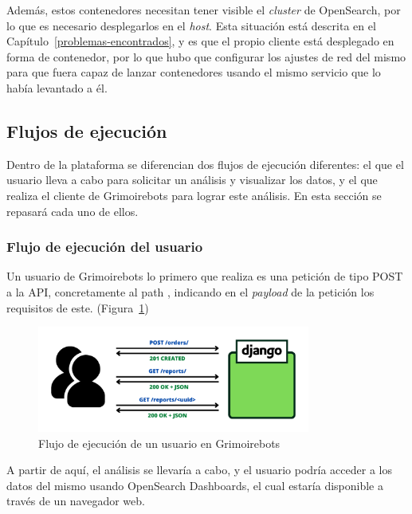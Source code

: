 Además, estos contenedores necesitan tener visible el \emph{cluster} de OpenSearch, por lo que es necesario desplegarlos en el \emph{host}. Esta situación está descrita en el Capítulo~{\ref{problemas-encontrados}}, y es que el propio cliente está desplegado en forma de contenedor, por lo que hubo que configurar los ajustes de red del mismo para que fuera capaz de lanzar contenedores usando el mismo servicio que lo había levantado a él.

\subsection{Flujos de ejecución}

Dentro de la plataforma se diferencian dos flujos de ejecución diferentes: el que el usuario lleva a cabo para solicitar un análisis y visualizar los datos, y el que realiza el cliente de Grimoirebots para lograr este análisis. En esta sección se repasará cada uno de ellos.

\subsubsection{Flujo de ejecución del usuario}

Un usuario de Grimoirebots lo primero que realiza es una petición de tipo POST a la API, concretamente al path , indicando en el \emph{payload} de la petición los requisitos de este. (Figura~{\ref{fig:grimoirebots_user_workflow}})

\begin{figure}[ht]
    \centering
    \includegraphics[width=0.8\textwidth]{Figures/grimoirebots_frontend}
    \decoRule
    \caption[Grimoirebots (flujo del usuario)]{Flujo de ejecución de un usuario en Grimoirebots}
    \label{fig:grimoirebots_user_workflow}
\end{figure}

A partir de aquí, el análisis se llevaría a cabo, y el usuario podría acceder a los datos del mismo usando OpenSearch Dashboards, el cual estaría disponible a través de un navegador web.

